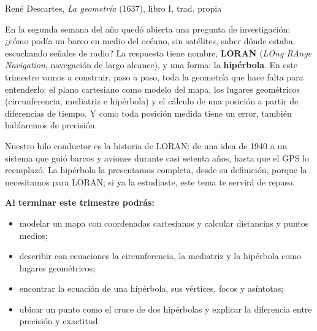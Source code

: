 \documentclass[11pt]{article}
\begin{document}
\encabezado

{René Descartes, \emph{La geometría} (1637), libro I, trad. propia}


En la segunda semana del año quedó abierta una pregunta de investigación: ¿cómo
podía un barco en medio del océano, sin satélites, saber dónde estaba escuchando
señales de radio? La respuesta tiene nombre, \textbf{LORAN} (\emph{LOng RAnge
Navigation}, navegación de largo alcance), y una forma: la \textbf{hipérbola}. En
este trimestre vamos a construir, paso a paso, toda la geometría que hace falta para
entenderlo: el plano cartesiano como modelo del mapa, los lugares geométricos
(circunferencia, mediatriz e hipérbola) y el cálculo de una posición a partir de
diferencias de tiempo. Y como toda posición medida tiene un error, también
hablaremos de precisión.

Nuestro hilo conductor es la historia de LORAN: de una idea de 1940 a un sistema que
guió barcos y aviones durante casi setenta años, hasta que el GPS lo reemplazó. La
hipérbola la presentamos completa, desde su definición, porque la necesitamos para
LORAN; si ya la estudiaste, este tema te servirá de repaso.

\textbf{Al terminar este trimestre podrás:}
\begin{itemize}
  \item modelar un mapa con coordenadas cartesianas y calcular distancias y puntos medios;
  \item describir con ecuaciones la circunferencia, la mediatriz y la hipérbola como lugares geométricos;
  \item encontrar la ecuación de una hipérbola, sus vértices, focos y asíntotas;
  \item ubicar un punto como el cruce de dos hipérbolas y explicar la diferencia entre precisión y exactitud.
\end{itemize}
\end{document}

